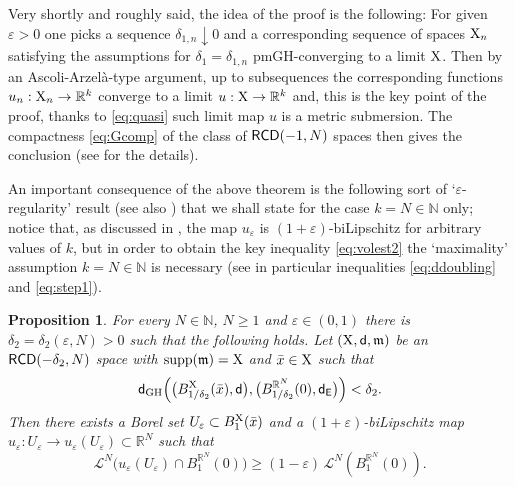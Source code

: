 \documentclass[reqno,11pt]{article}
\numberwithin{equation}{section}
\newcommand{\N}{\mathbb{N}}
\newcommand{\R}{\mathbb{R}}
\newcommand{\mm}{{\mbox{\boldmath$m$}}}
\newcommand{\sfd}{{\sf d}}
\newcommand{\supp}{\mathop{\rm supp}\nolimits}   %
\newcommand{\eps}{\varepsilon}
\renewcommand{\mm}{\mathfrak m}                                %
\newtheorem{lemma}[theorem]{Lemma}
\newtheorem{proposition}[theorem]{Proposition}
\newcommand{\X}{{\rm X}}
\newcommand{\RCD}{{\sf RCD}}
\newcommand{\Eu}{{\sf E}}
\newcommand{\LL}{{\mathcal L}}
\begin{document}
Very shortly and roughly said, the idea of the proof is the following: For given $\eps>0$ one picks a sequence $\delta_{1,n}\downarrow0$ and a corresponding sequence of spaces $\X_n$ satisfying the assumptions for $\delta_1=\delta_{1,n}$ pmGH-converging to a limit $\X$. Then by an Ascoli-Arzel\`a-type argument, up to subsequences the corresponding functions $u_n:\X_n\to\R^k$ converge to a limit $u:\X\to\R^k$ and, this is the key point of the proof,  thanks to \eqref{eq:quasi} such limit map $u$ is a { metric submersion}. The compactness \eqref{eq:Gcomp} of the class of $\RCD(-1,N)$ spaces then gives the conclusion (see \cite[Theorem 5.1]{Mondino-Naber14} for the details).



An important  consequence of the above theorem is the following sort of `\(\varepsilon\)-regularity'  result (see also  \cite[Theorem 6.8]{Mondino-Naber14})  that we shall state for the case $k=N\in\N$ only; notice that, as discussed in \cite{Mondino-Naber14}, the map $u_\eps$ is  $(1+\eps)$-biLipschitz for arbitrary values of $k$, but in order to obtain the key inequality \eqref{eq:volest2} the `maximality' assumption $k=N\in\N$ is necessary (see in particular inequalities \eqref{eq:ddoubling} and \eqref{eq:step1}).

\begin{proposition}\label{thm:MN2} For every  $N\in \N$, $N\geq 1$ and   \(\varepsilon\in (0,1)\) there is  \(\delta_2=\delta_2(\varepsilon,N)>0\) such that the following holds. Let $(\X,\sfd,\mm)$ be  an $\RCD(-\delta_2,N)$ space with $\supp(\mm)=\X$ and $\bar x\in\X$ such that
\begin{equation}\label{viciniviciniGH}
\sfd_{\rm GH}\Big(\big(B^\X_{1/\delta_2}(\bar x),\sfd\big),  \big(B^{\R^N}_{1/\delta_2}(0),\sfd_{\Eu}\big)\Big)<\delta_2.
\end{equation}
Then there exists a Borel set  \(U_{\eps}\subset B_1^\X(\bar x)\)  and a $(1+\eps)$-biLipschitz map $u_\eps:U_\eps\to u_\eps(U_\eps)\subset \R^N $ such that 
\begin{equation}
\label{eq:volest2}
\LL^N\big( u_\eps(U_\eps)\cap B^{\R^N}_{1}(0)\big)\geq (1-\eps)\,\LL^N( B_1^{\R^N}(0)).
\end{equation}
\end{proposition}

%
\end{document}
